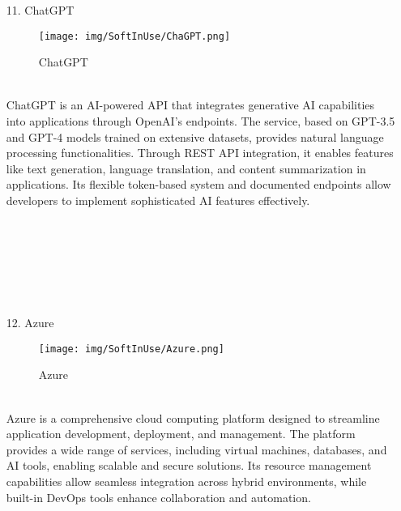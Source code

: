 \documentclass[conference]{IEEEtran}
\begin{document}
\begin{enumerate}
\item[11.] ChatGPT
\begin{figure}[h]
\hspace{1.5cm}
\centering
\begin{minipage}{0.4\columnwidth}
    \texttt{[image: img/SoftInUse/ChaGPT.png]}
    \caption{ChatGPT}
\end{minipage}
\end{figure}\\
ChatGPT is an AI-powered API that integrates generative AI capabilities into applications through OpenAI's endpoints. The service, based on GPT-3.5 and GPT-4 models trained on extensive datasets, provides natural language processing functionalities. Through REST API integration, it enables features like text generation, language translation, and content summarization in applications. Its flexible token-based system and documented endpoints allow developers to implement sophisticated AI features effectively.\\ \\ \\ \\ \\ \\ \\

\item[12.] Azure
\begin{figure}[h]
\hspace{1.5cm}
\centering
\begin{minipage}{0.7\columnwidth}
    \texttt{[image: img/SoftInUse/Azure.png]}
    \caption{Azure}
\end{minipage}
\end{figure} \\
Azure is a comprehensive cloud computing platform designed to streamline application development, deployment, and management. The platform provides a wide range of services, including virtual machines, databases, and AI tools, enabling scalable and secure solutions. Its resource management capabilities allow seamless integration across hybrid environments, while built-in DevOps tools enhance collaboration and automation.
\clearpage

\end{enumerate}
\end{document}
